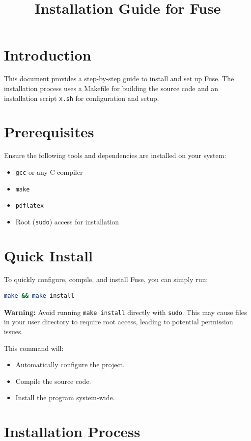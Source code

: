 \documentclass[a4paper,12pt]{article}
\title{\textbf{Installation Guide for Fuse}}
\author{}
\date{}
\begin{document}
\maketitle

\section*{Introduction}
This document provides a step-by-step guide to install and set up Fuse. The installation process uses a Makefile for building the source code and an installation script \texttt{x.sh} for configuration and setup.

\section*{Prerequisites}
Ensure the following tools and dependencies are installed on your system:
\begin{itemize}
	\item \texttt{gcc} or any C compiler
	\item \texttt{make}
	\item \texttt{pdflatex}
	\item Root (\texttt{sudo}) access for installation
\end{itemize}

\section*{Quick Install}
To quickly configure, compile, and install Fuse, you can simply run:
\begin{lstlisting}[language=bash]
make && make install
\end{lstlisting}
\textbf{Warning:} Avoid running \texttt{make install} directly with \texttt{sudo}. This may cause files in your user directory to require root access, leading to potential permission issues.

This command will:
\begin{itemize}
	\item Automatically configure the project.
	\item Compile the source code.
	\item Install the program system-wide.
\end{itemize}

\section*{Installation Process}
\end{document}

